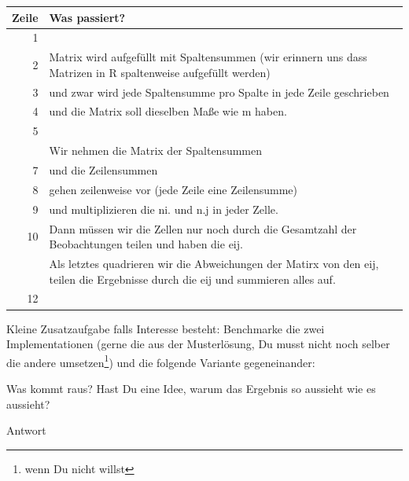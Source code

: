 \documentclass[
]{book}
\newenvironment{Shaded}{\begin{snugshade}}{\end{snugshade}}
\newcommand{\FunctionTok}[1]{\textcolor[rgb]{0.00,0.00,0.00}{#1}}
\newcommand{\NormalTok}[1]{#1}
\newcommand{\SpecialCharTok}[1]{\textcolor[rgb]{0.00,0.00,0.00}{#1}}
\begin{document}
\begin{table}
\centering
\begin{tabular}[t]{rl}
\toprule
Zeile & Was passiert?\\
\midrule
1 & \\
2 & Matrix wird aufgefüllt mit Spaltensummen (wir erinnern uns dass Matrizen in R spaltenweise aufgefüllt werden)\\
3 & und zwar wird jede Spaltensumme pro Spalte in jede Zeile geschrieben\\
4 & und die Matrix soll dieselben Maße wie m haben.\\
5 & \\
\addlinespace
6 & Wir nehmen die Matrix der Spaltensummen\\
7 & und die Zeilensummen\\
8 & gehen zeilenweise vor (jede Zeile eine Zeilensumme)\\
9 & und multiplizieren die ni. und n.j in jeder Zelle.\\
10 & Dann müssen wir die Zellen nur noch durch die Gesamtzahl der Beobachtungen teilen und haben die eij.\\
\addlinespace
11 & Als letztes quadrieren wir die Abweichungen der Matirx von den eij, teilen die Ergebnisse durch die eij und summieren alles auf.\\
12 & \\
\bottomrule
\end{tabular}
\end{table}

Kleine Zusatzaufgabe falls Interesse besteht:
Benchmarke die zwei Implementationen (gerne die aus der Musterlösung, Du musst nicht noch selber die andere umsetzen\footnote{wenn Du nicht willst}) und die folgende Variante gegeneinander:

\begin{Shaded}
\end{Shaded}

Was kommt raus?
Hast Du eine Idee, warum das Ergebnis so aussieht wie es aussieht?

Antwort
\end{document}
